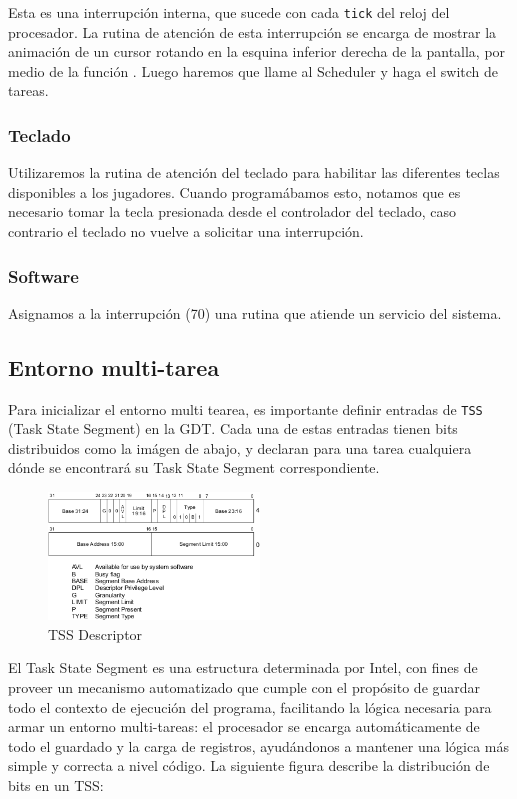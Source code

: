 Esta es una interrupción interna, que sucede con cada \texttt{tick} del reloj del procesador. La rutina de atención de esta interrupción se encarga de mostrar la animación de un cursor rotando en la esquina inferior derecha de la pantalla, por medio de la función . Luego haremos que llame al Scheduler y haga el switch de tareas.

\subsubsection{Teclado}
Utilizaremos la rutina de atención del teclado para habilitar las diferentes teclas disponibles a los jugadores. Cuando programábamos esto, notamos que es necesario tomar la tecla presionada desde el controlador del teclado, caso contrario el teclado no vuelve a solicitar una interrupción.

\subsubsection{Software}
Asignamos a la interrupción  (70) una rutina que atiende un servicio del sistema.

\subsection{Entorno multi-tarea}

Para inicializar el entorno multi tearea, es importante definir entradas de \texttt{TSS} (Task State Segment) en la GDT. Cada una de estas entradas tienen bits distribuidos como la imágen de abajo, y declaran para una tarea cualquiera dónde se encontrará su Task State Segment correspondiente.

\begin{figure}[H]
  \centering
    \includegraphics[width=0.5\textwidth]{images/tss_descriptor}
  \caption{TSS Descriptor}
\end{figure}

El Task State Segment es una estructura determinada por Intel, con fines de proveer un mecanismo automatizado que cumple con el propósito de guardar todo el contexto de ejecución del programa, facilitando la lógica necesaria para armar un entorno multi-tareas: el procesador se encarga automáticamente de todo el guardado y la carga de registros, ayudándonos a mantener una lógica más simple y correcta a nivel código. La siguiente figura describe la distribución de bits en un TSS:

